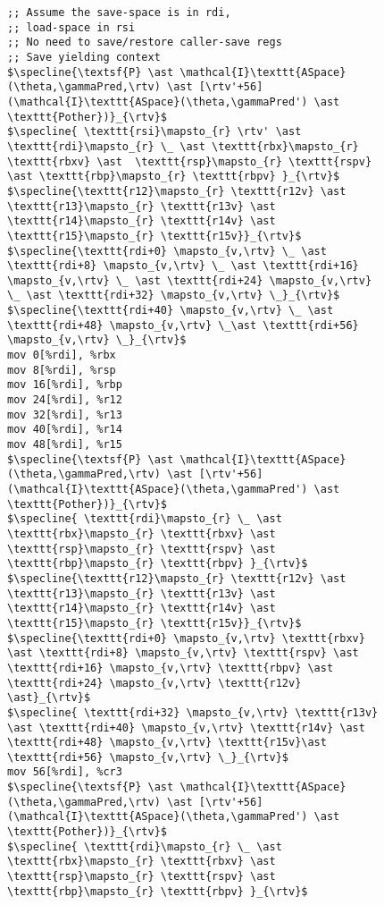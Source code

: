 \begin{figure}\footnotesize
\begin{lstlisting}
;; Assume the save-space is in rdi,
;; load-space in rsi
;; No need to save/restore caller-save regs
;; Save yielding context
$\specline{\textsf{P} \ast \mathcal{I}\texttt{ASpace}(\theta,\gammaPred,\rtv) \ast [\rtv'+56](\mathcal{I}\texttt{ASpace}(\theta,\gammaPred') \ast \texttt{Pother})}_{\rtv}$
$\specline{ \texttt{rsi}\mapsto_{r} \rtv' \ast \texttt{rdi}\mapsto_{r} \_ \ast \texttt{rbx}\mapsto_{r} \texttt{rbxv} \ast  \texttt{rsp}\mapsto_{r} \texttt{rspv} \ast \texttt{rbp}\mapsto_{r} \texttt{rbpv} }_{\rtv}$
$\specline{\texttt{r12}\mapsto_{r} \texttt{r12v} \ast \texttt{r13}\mapsto_{r} \texttt{r13v} \ast \texttt{r14}\mapsto_{r} \texttt{r14v} \ast \texttt{r15}\mapsto_{r} \texttt{r15v}}_{\rtv}$
$\specline{\texttt{rdi+0} \mapsto_{v,\rtv} \_ \ast \texttt{rdi+8} \mapsto_{v,\rtv} \_ \ast \texttt{rdi+16} \mapsto_{v,\rtv} \_ \ast \texttt{rdi+24} \mapsto_{v,\rtv} \_ \ast \texttt{rdi+32} \mapsto_{v,\rtv} \_}_{\rtv}$
$\specline{\texttt{rdi+40} \mapsto_{v,\rtv} \_ \ast \texttt{rdi+48} \mapsto_{v,\rtv} \_\ast \texttt{rdi+56} \mapsto_{v,\rtv} \_}_{\rtv}$
mov 0[%rdi], %rbx
mov 8[%rdi], %rsp
mov 16[%rdi], %rbp
mov 24[%rdi], %r12
mov 32[%rdi], %r13
mov 40[%rdi], %r14
mov 48[%rdi], %r15
$\specline{\textsf{P} \ast \mathcal{I}\texttt{ASpace}(\theta,\gammaPred,\rtv) \ast [\rtv'+56](\mathcal{I}\texttt{ASpace}(\theta,\gammaPred') \ast \texttt{Pother})}_{\rtv}$
$\specline{ \texttt{rdi}\mapsto_{r} \_ \ast \texttt{rbx}\mapsto_{r} \texttt{rbxv} \ast  \texttt{rsp}\mapsto_{r} \texttt{rspv} \ast \texttt{rbp}\mapsto_{r} \texttt{rbpv} }_{\rtv}$
$\specline{\texttt{r12}\mapsto_{r} \texttt{r12v} \ast \texttt{r13}\mapsto_{r} \texttt{r13v} \ast \texttt{r14}\mapsto_{r} \texttt{r14v} \ast \texttt{r15}\mapsto_{r} \texttt{r15v}}_{\rtv}$
$\specline{\texttt{rdi+0} \mapsto_{v,\rtv} \texttt{rbxv} \ast \texttt{rdi+8} \mapsto_{v,\rtv} \texttt{rspv} \ast \texttt{rdi+16} \mapsto_{v,\rtv} \texttt{rbpv} \ast \texttt{rdi+24} \mapsto_{v,\rtv} \texttt{r12v} \ast}_{\rtv}$
$\specline{ \texttt{rdi+32} \mapsto_{v,\rtv} \texttt{r13v} \ast \texttt{rdi+40} \mapsto_{v,\rtv} \texttt{r14v} \ast \texttt{rdi+48} \mapsto_{v,\rtv} \texttt{r15v}\ast \texttt{rdi+56} \mapsto_{v,\rtv} \_}_{\rtv}$
mov 56[%rdi], %cr3
$\specline{\textsf{P} \ast \mathcal{I}\texttt{ASpace}(\theta,\gammaPred,\rtv) \ast [\rtv'+56](\mathcal{I}\texttt{ASpace}(\theta,\gammaPred') \ast \texttt{Pother})}_{\rtv}$
$\specline{ \texttt{rdi}\mapsto_{r} \_ \ast \texttt{rbx}\mapsto_{r} \texttt{rbxv} \ast  \texttt{rsp}\mapsto_{r} \texttt{rspv} \ast \texttt{rbp}\mapsto_{r} \texttt{rbpv} }_{\rtv}$

\end{lstlisting}
\end{figure}
